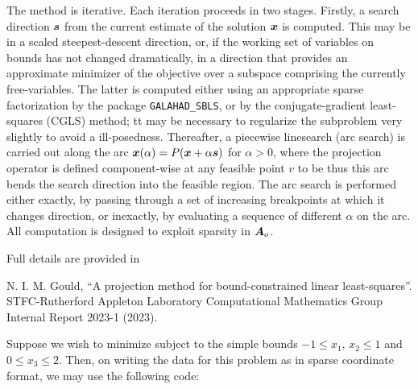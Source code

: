\documentclass{galahad}
\begin{document}
The method is iterative. Each iteration proceeds in two stages.
Firstly, a search direction ${\bm{s}}$ from the current estimate of the solution
${\bm{x}}$ is computed. This may be in a scaled steepest-descent direction, or,
if the working set of variables on bounds has not changed dramatically,
in a direction that provides an approximate minimizer of the objective
over a subspace comprising the currently free-variables. The latter is
computed either using an appropriate sparse factorization by the
package {\tt GALAHAD\_SBLS}, or by the
conjugate-gradient least-squares (CGLS) method; tt may be necessary to
regularize the subproblem very slightly to avoid a ill-posedness.
Thereafter, a piecewise linesearch (arc search) is carried out along
the arc ${\bm{x}}(\alpha) = P( {\bm{x}} + \alpha {\bm{s}})$ for $\alpha > 0$,
where the projection operator
is defined component-wise at any feasible point $v$ to be
thus this arc bends the search direction into the feasible region.
The arc search is performed either exactly, by passing through a set
of increasing breakpoints at which it changes direction, or inexactly,
by evaluating a sequence of different $\alpha$  on the arc.
All computation is designed to exploit sparsity in ${\bm{A}}_o$.

\vspace*{1mm}

\galreferences
\vspace*{1mm}

\noindent
Full details are provided in
\vspace*{1mm}

\noindent
N. I. M. Gould,
``A projection method for bound-constrained linear least-squares''.
STFC-Rutherford Appleton Laboratory Computational Mathematics Group
Internal Report 2023-1 (2023).


\galexample
Suppose we wish to minimize
subject to the simple bounds
$-1  \leq  x_{1}$,
$x_{2} \leq 1$
and $0 \leq x_{3}  \leq  2$.
Then, on writing the data for this problem as
in sparse coordinate format, we may use the following code:
\end{document}
